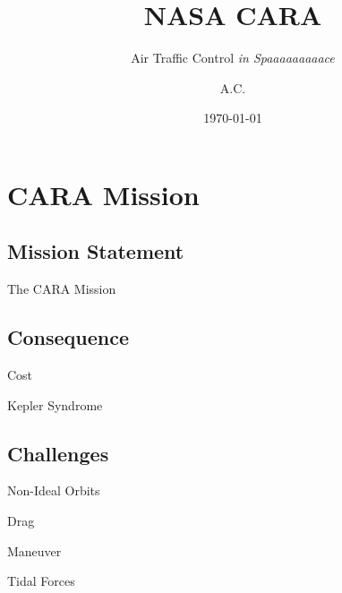 \documentclass[pdf]{beamer}
\title{NASA CARA}
\subtitle{Air Traffic Control \emph{in Spaaaaaaaaace}}
\author{A.C.}
\date{\today}
\begin{document}
\begin{frame}
  \titlepage
\end{frame}

\section{CARA Mission}
\subsection{Mission Statement}
\begin{frame}{The CARA Mission}
\end{frame}

\subsection{Consequence}
\begin{frame}{Cost}
\end{frame}

\begin{frame}{Kepler Syndrome}
\end{frame}

\subsection{Challenges}
\begin{frame}{Non-Ideal Orbits}
\end{frame}

\begin{frame}{Drag}
\end{frame}

\begin{frame}{Maneuver}
\end{frame}

\begin{frame}{Tidal Forces}
\end{frame}
\end{document}
